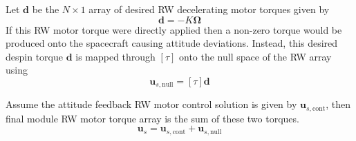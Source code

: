 Let $\bm d$ be the $N\times 1$ array of desired RW decelerating motor torques given by
\begin{equation}
	\bm d = -K \bm\Omega
\end{equation}
If this RW motor torque were directly applied then a non-zero torque would be produced onto the spacecraft causing attitude deviations.  Instead, this desired despin torque $\bm d$ is mapped through $[\tau]$ onto the null space of the RW array using
\begin{equation}
	\bm u_{s,\text{null}} = [\tau] \bm d
\end{equation}

Assume the attitude feedback RW motor control solution is given by $\bm u_{s,\text{cont}}$, then final module RW motor torque array is the sum of these two torques.
\begin{equation}
	\bm u_{s} = \bm u_{s,\text{cont}} + \bm u_{s,\text{null}} 
\end{equation}




